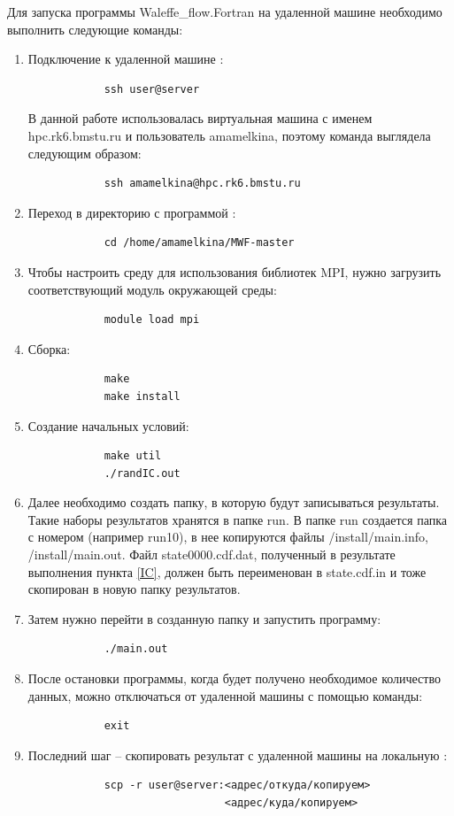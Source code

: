 Для запуска программы Waleffe\_flow.Fortran на удаленной машине необходимо выполнить следующие команды:
\begin{enumerate}
    \item Подключение к удаленной машине \cite{ssh-comand}:
            \begin{verbatim}
            ssh user@server  \end{verbatim}
        В данной работе использовалась виртуальная машина с именем hpc.rk6.bmstu.ru и пользователь amamelkina, поэтому команда выглядела следующим образом: \begin{verbatim}
            ssh amamelkina@hpc.rk6.bmstu.ru   \end{verbatim}
    \item Переход в директорию с программой  \cite{ubuntu-comand}:
            \begin{verbatim}
            cd /home/amamelkina/MWF-master    \end{verbatim}
    \item Чтобы настроить среду для использования библиотек MPI, нужно загрузить соответствующий модуль окружающей среды:
            \begin{verbatim}
            module load mpi \end{verbatim}
    \item Сборка:
            \begin{verbatim}
            make
            make install    \end{verbatim}
    \item Создание начальных условий: \label{IC}
            \begin{verbatim}
            make util
            ./randIC.out    \end{verbatim}
    \item Далее необходимо создать папку, в которую будут записываться результаты. Такие наборы результатов хранятся в папке run. В папке run создается папка с номером (например run10), в нее копируются файлы /install/main.info, /install/main.out. Файл state0000.cdf.dat, полученный в результате выполнения пункта \ref{IC}, должен быть переименован в state.cdf.in и тоже скопирован в новую папку результатов.
    \item Затем нужно перейти в созданную папку и запустить программу:
            \begin{verbatim}
            ./main.out    \end{verbatim}
    \item После остановки программы, когда будет получено необходимое количество данных, можно отключаться от удаленной машины с помощью команды:
            \begin{verbatim} 
            exit \end{verbatim}
    \item Последний шаг -- скопировать результат с удаленной машины на локальную \cite{ssh-cp}:
            \begin{verbatim}
            scp -r user@server:<адрес/откуда/копируем>
                               <адрес/куда/копируем>  \end{verbatim}
\end{enumerate}

